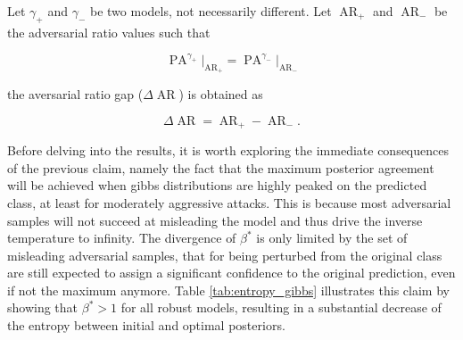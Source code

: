 \begin{definition}
    Let $\gamma_+$ and $\gamma_-$ be two models, not necessarily different. Let $\operatorname{AR}_{+}$ and 
    $\operatorname{AR}_{-}$ be the adversarial ratio values such that

    $$
    \operatorname{PA}^{\gamma_+} \bigg|_{\operatorname{AR}_{+}} = \operatorname{PA}^{\gamma_-}\bigg|_{\operatorname{AR}_{-}}
    $$

    the aversarial ratio gap ($\Delta \operatorname{AR}$) is obtained as

    $$
    \Delta\operatorname{AR} = \operatorname{AR}_{+} - \operatorname{AR}_{-}. 
    $$
\end{definition}

Before delving into the results, it is worth exploring the immediate consequences
of the previous claim, namely the fact that the maximum posterior agreement will
be achieved when gibbs distributions are highly peaked on the predicted 
class, at least for moderately aggressive attacks. This is because most adversarial 
samples will not succeed at misleading the model and thus drive the inverse temperature to
infinity. The divergence of $\beta^{*}$ is only limited by the set of misleading adversarial 
samples, that for being perturbed from the original class are still expected to assign a
significant confidence to the original prediction, even if not the maximum anymore.
Table \ref{tab:entropy_gibbs} illustrates this claim by showing that $\beta^{*} > 1$ 
for all robust models, resulting in a substantial decrease of the entropy between initial and 
optimal posteriors. \\

